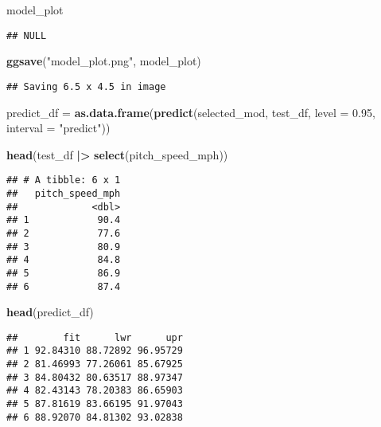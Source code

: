 \documentclass[
]{article}
\newenvironment{Shaded}{\begin{snugshade}}{\end{snugshade}}
\newcommand{\AttributeTok}[1]{\textcolor[rgb]{0.13,0.29,0.53}{#1}}
\newcommand{\FloatTok}[1]{\textcolor[rgb]{0.00,0.00,0.81}{#1}}
\newcommand{\FunctionTok}[1]{\textcolor[rgb]{0.13,0.29,0.53}{\textbf{#1}}}
\newcommand{\NormalTok}[1]{#1}
\newcommand{\OtherTok}[1]{\textcolor[rgb]{0.56,0.35,0.01}{#1}}
\newcommand{\SpecialCharTok}[1]{\textcolor[rgb]{0.81,0.36,0.00}{\textbf{#1}}}
\newcommand{\StringTok}[1]{\textcolor[rgb]{0.31,0.60,0.02}{#1}}
\begin{document}
\begin{Shaded}
\begin{Highlighting}[]
\NormalTok{model\_plot}
\end{Highlighting}
\end{Shaded}

\begin{verbatim}
## NULL
\end{verbatim}

\begin{Shaded}
\begin{Highlighting}[]
\FunctionTok{ggsave}\NormalTok{(}\StringTok{"model\_plot.png"}\NormalTok{, model\_plot)}
\end{Highlighting}
\end{Shaded}

\begin{verbatim}
## Saving 6.5 x 4.5 in image
\end{verbatim}

\begin{Shaded}
\begin{Highlighting}[]
\NormalTok{predict\_df }\OtherTok{=} \FunctionTok{as.data.frame}\NormalTok{(}\FunctionTok{predict}\NormalTok{(selected\_mod, test\_df, }\AttributeTok{level =} \FloatTok{0.95}\NormalTok{, }\AttributeTok{interval =} \StringTok{"predict"}\NormalTok{))}
\end{Highlighting}
\end{Shaded}

\begin{Shaded}
\begin{Highlighting}[]
\FunctionTok{head}\NormalTok{(test\_df }\SpecialCharTok{|\textgreater{}}
       \FunctionTok{select}\NormalTok{(pitch\_speed\_mph))}
\end{Highlighting}
\end{Shaded}

\begin{verbatim}
## # A tibble: 6 x 1
##   pitch_speed_mph
##             <dbl>
## 1            90.4
## 2            77.6
## 3            80.9
## 4            84.8
## 5            86.9
## 6            87.4
\end{verbatim}

\begin{Shaded}
\begin{Highlighting}[]
\FunctionTok{head}\NormalTok{(predict\_df)}
\end{Highlighting}
\end{Shaded}

\begin{verbatim}
##        fit      lwr      upr
## 1 92.84310 88.72892 96.95729
## 2 81.46993 77.26061 85.67925
## 3 84.80432 80.63517 88.97347
## 4 82.43143 78.20383 86.65903
## 5 87.81619 83.66195 91.97043
## 6 88.92070 84.81302 93.02838
\end{verbatim}
\end{document}
